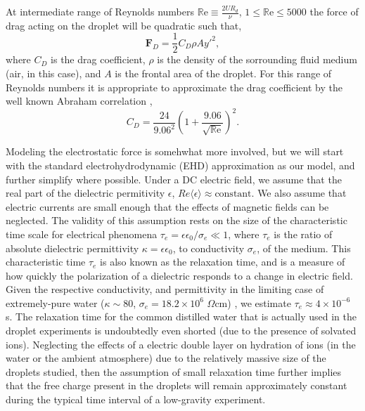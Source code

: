 \documentclass[12pt,a4paper,oneside]{book}
\begin{document}
At intermediate range of Reynolds numbers $\mathbb{R}\mbox{e} \equiv \frac{2UR_d}{\nu}$, $1 \leq \mathbb{R}\mbox{e} \leq 5000 $ the force of drag acting on the droplet will be quadratic such that,
\begin{equation*}\label{drag_force}
\mathbf{F}_D = \frac{1}{2}C_D \rho A {y'}^2,
\end{equation*}
where $C_D$ is the drag coefficient, $\rho$ is the density of the sorrounding fluid medium (air, in this case), and $A$ is the frontal area of the droplet. For this range of Reynolds numbers it is appropriate to approximate the drag coefficient by the well known Abraham correlation \cite{abraham_functional_1970},
\[C_D = \frac{24}{9.06^2} \left( 1 + \frac{9.06}{\sqrt{\mathbb{R}\mbox{e}}} \right)^2 .\]

Modeling the electrostatic force is somehwhat more involved, but we will start with the standard electrohydrodynamic (EHD) approximation \cite{saville_electrohydrodynamics:taylor-melcher_1997} as our model, and further simplify where possible. Under a DC electric field, we assume that the real part of the dielectric permitivity $\epsilon$, $Re \langle \epsilon \rangle \approx  \mbox{constant}$. We also assume that electric currents are small enough that the effects of magnetic fields can be neglected. The validity of this assumption rests on the size of the characteristic time scale for electrical phenomena $\tau_e = \epsilon \epsilon_0/\sigma_e \ll 1$, where $\tau_e$ is the ratio of absolute dielectric permittivity $\kappa = \epsilon \epsilon_0$, to conductivity $\sigma_e$, of the medium. This characteristic time $\tau_e$ is also known as the relaxation time, and is a measure of how quickly the polarization of a dielectric responds to a change in electric field. Given the respective conductivity, and permittivity in the limiting case of extremely-pure water ($ \kappa \sim 80$, $\sigma_e = 18.2 \times 10^{6}$ $\Omega\mbox{cm}$) \cite{yatsuzuka_electrification_1994}, we estimate $\tau_e \approx 4 \times 10^{-6}$ s. The relaxation time for the common distilled water that is actually used in the droplet experiments is undoubtedly even shorted (due to the presence of solvated ions). Neglecting the effects of a electric double layer on hydration of ions (in the water or the ambient atmosphere) due to the relatively massive size of the droplets studied, then the assumption of small relaxation time further implies that the free charge present in the droplets will remain approximately constant during the typical time interval of a low-gravity experiment.
\end{document}
